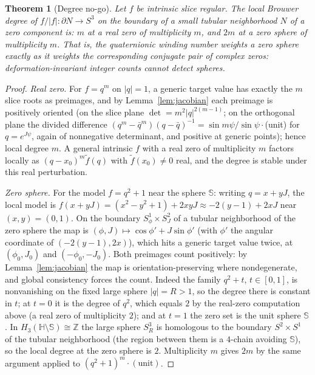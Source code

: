 \documentclass[11pt]{amsart}
\theoremstyle{plain}
\newtheorem{mainthm}{Theorem}
\theoremstyle{definition}
\theoremstyle{remark}
\newcommand{\HH}{\mathbb{H}}
\newcommand{\ZZ}{\mathbb{Z}}
\renewcommand{\SS}{\mathbb{S}}
\begin{document}
\begin{mainthm}[Degree no-go]\label{thm:degree-nogo}
Let $f$ be intrinsic slice regular. The local Brouwer degree of $f/|f|\colon\partial N\to S^3$ on
the boundary of a small tubular neighborhood $N$ of a zero component is: $m$ at a real zero of
multiplicity $m$, and $2m$ at a zero sphere of multiplicity $m$. That is, the quaternionic winding
number weights a zero sphere exactly as it weights the corresponding conjugate pair of complex
zeros: deformation-invariant integer counts cannot detect spheres.
\end{mainthm}

\begin{proof}
\emph{Real zero.} For $f=q^m$ on $|q|=1$, a generic target value has exactly the $m$ slice roots
as preimages, and by Lemma~\ref{lem:jacobian} each preimage is positively oriented (on the slice
plane $\det=m^2|q|^{2(m-1)}$; on the orthogonal plane the divided difference
$(q^m-\bar q^m)(q-\bar q)^{-1}=\sin m\psi/\sin\psi\cdot$(unit) for $q=e^{J\psi}$, again of
nonnegative determinant, and positive at generic points); hence local degree $m$. A general
intrinsic $f$ with a real zero of multiplicity $m$ factors locally as $(q-x_0)^m\tilde f(q)$ with
$\tilde f(x_0)\neq0$ real, and the degree is stable under this real perturbation.

\emph{Zero sphere.} For the model $f=q^2+1$ near the sphere $\SS$: writing $q=x+yJ$, the local
model is $f(x+yJ)=(x^2-y^2+1)+2xyJ\approx-2(y-1)+2xJ$ near $(x,y)=(0,1)$. On the boundary
$S^1_\phi\times S^2_J$ of a tubular neighborhood of the zero sphere the map is
$(\phi,J)\mapsto\cos\phi'+J\sin\phi'$ (with $\phi'$ the angular coordinate of
$(-2(y-1),2x)$), which hits a generic target value twice, at $(\phi_0,J_0)$ and $(-\phi_0,-J_0)$.
Both preimages count positively: by Lemma~\ref{lem:jacobian} the map is orientation-preserving
where nondegenerate, and global consistency forces the count. Indeed the family $q^2+t$,
$t\in[0,1]$, is nonvanishing on the fixed large sphere $|q|=R>1$, so the degree there is constant
in $t$; at $t=0$ it is the degree of $q^2$, which equals $2$ by the real-zero computation above
(a real zero of multiplicity $2$); and at $t=1$ the zero set is the unit sphere $\SS$. In
$H_3(\HH\setminus\SS)\cong\ZZ$ the large sphere $S^3_R$ is homologous to the boundary
$S^2\times S^1$ of the tubular neighborhood (the region between them is a $4$-chain avoiding
$\SS$), so the local degree at the zero sphere is $2$. Multiplicity
$m$ gives $2m$ by the same argument applied to $(q^2+1)^m\cdot(\text{unit})$.
\end{proof}
\end{document}
